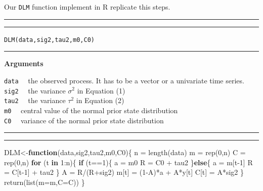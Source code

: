 \documentclass[
]{book}
\newenvironment{Shaded}{\begin{snugshade}}{\end{snugshade}}
\newcommand{\AttributeTok}[1]{\textcolor[rgb]{0.77,0.63,0.00}{#1}}
\newcommand{\ControlFlowTok}[1]{\textcolor[rgb]{0.13,0.29,0.53}{\textbf{#1}}}
\newcommand{\DecValTok}[1]{\textcolor[rgb]{0.00,0.00,0.81}{#1}}
\newcommand{\FunctionTok}[1]{\textcolor[rgb]{0.00,0.00,0.00}{#1}}
\newcommand{\NormalTok}[1]{#1}
\newcommand{\OtherTok}[1]{\textcolor[rgb]{0.56,0.35,0.01}{#1}}
\newcommand{\SpecialCharTok}[1]{\textcolor[rgb]{0.00,0.00,0.00}{#1}}
\theoremstyle{break}
\theoremstyle{nonumberplain}
\begin{document}
Our \texttt{DLM} function implement in R replicate this steps.\\

\hrule
\hrule
\texttt{DLM(data,sig2,tau2,m0,C0)}
\hrule

\textbf{Arguments}

\texttt{data} ~~the observed process. It has to be a vector or a
univariate time series.\\
\texttt{sig2} ~~the variance \(\sigma^{2}\) in Equation (1)\\
\texttt{tau2} ~~the variance \(\tau^{2}\) in Equation (2)\\
\texttt{m0} ~~central value of the normal prior state distribution\\
\texttt{C0} ~~variance of the normal prior state distribution

\hrule
\hrule

\begin{Shaded}
\begin{Highlighting}[]
\NormalTok{DLM}\OtherTok{\textless{}{-}}\ControlFlowTok{function}\NormalTok{(data,sig2,tau2,m0,C0)\{}
\NormalTok{  n  }\OtherTok{=} \FunctionTok{length}\NormalTok{(data)}
\NormalTok{  m  }\OtherTok{=} \FunctionTok{rep}\NormalTok{(}\DecValTok{0}\NormalTok{,n)}
\NormalTok{  C  }\OtherTok{=} \FunctionTok{rep}\NormalTok{(}\DecValTok{0}\NormalTok{,n)}
  \ControlFlowTok{for}\NormalTok{ (t }\ControlFlowTok{in} \DecValTok{1}\SpecialCharTok{:}\NormalTok{n)\{}
    \ControlFlowTok{if}\NormalTok{ (t}\SpecialCharTok{==}\DecValTok{1}\NormalTok{)\{}
\NormalTok{      a }\OtherTok{=}\NormalTok{ m0}
\NormalTok{      R }\OtherTok{=}\NormalTok{ C0 }\SpecialCharTok{+}\NormalTok{ tau2}
\NormalTok{    \}}\ControlFlowTok{else}\NormalTok{\{}
\NormalTok{      a }\OtherTok{=}\NormalTok{ m[t}\DecValTok{{-}1}\NormalTok{]}
\NormalTok{      R }\OtherTok{=}\NormalTok{ C[t}\DecValTok{{-}1}\NormalTok{] }\SpecialCharTok{+}\NormalTok{ tau2}
\NormalTok{    \}}
\NormalTok{    A }\OtherTok{=}\NormalTok{ R}\SpecialCharTok{/}\NormalTok{(R}\SpecialCharTok{+}\NormalTok{sig2)}
\NormalTok{    m[t] }\OtherTok{=}\NormalTok{ (}\DecValTok{1}\SpecialCharTok{{-}}\NormalTok{A)}\SpecialCharTok{*}\NormalTok{a }\SpecialCharTok{+}\NormalTok{ A}\SpecialCharTok{*}\NormalTok{y[t]}
\NormalTok{    C[t] }\OtherTok{=}\NormalTok{ A}\SpecialCharTok{*}\NormalTok{sig2}
\NormalTok{  \}}
  \FunctionTok{return}\NormalTok{(}\FunctionTok{list}\NormalTok{(}\AttributeTok{m=}\NormalTok{m,}\AttributeTok{C=}\NormalTok{C))}
\NormalTok{\}}
\end{Highlighting}
\end{Shaded}
\end{document}

